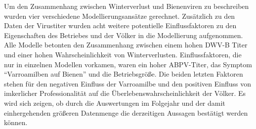 \newline
 Um den Zusammenhang zwischen Winterverlust und Bienenviren zu beschreiben wurden vier verschiedene Modellierungsansätze gerechnet. Zusätzlich zu den Daten der Virustiter wurden acht weitere potentielle Einflussfaktoren zu den Eigenschaften des Betriebes und der Völker in die Modellierung aufgenommen. Alle Modelle betonten den Zusammenhang zwischen einem hohen DWV-B Titer und einer hohen Wahrscheinlichkeit von Winterverlusten. Einflussfaktoren, die nur in einzelnen Modellen vorkamen, waren ein hoher ABPV-Titer, das Symptom \enquote{Varroamilben auf Bienen} und die Betriebsgröße. Die beiden letzten Faktoren stehen für den negativen Einfluss der Varroamilbe und den positiven Einfluss von imkerlicher Professionalität auf die Überlebenswahrscheinlichkeit der Völker.
 Es wird sich zeigen, ob durch die Auswertungen im Folgejahr und der damit einhergehenden größeren Datenmenge die derzeitigen Aussagen bestätigt werden können.